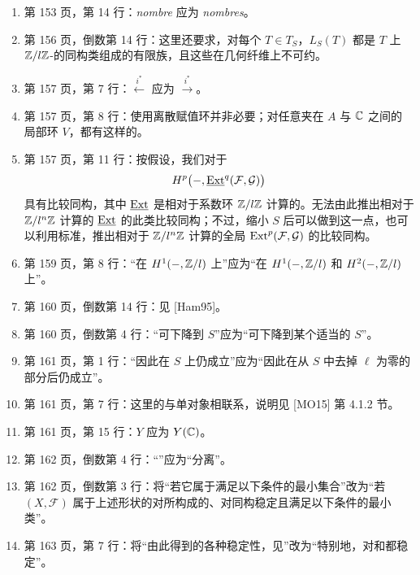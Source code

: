 \begin{enumerate}[label=\arabic*.,leftmargin=2.5em,itemsep=.65\baselineskip]
\[
i^*j_*F=\varprojlim i^*j_*(F/\ell^nF),
\]
其中 $U$ 是若干的开并，$Z$ 为其补集，$F$ 为 $U(\C)$ 上的 $\Z_\ell$-。对满足良好条件的空间，例如来自局部有限三角剖分的空间，这样做是可行的。
\item 第 153 页，第 14 行：\emph{nombre} 应为 \emph{nombres}。
\item 第 156 页，倒数第 14 行：这里还要求，对每个 $T\in T_S$，$L_S(T)$ 都是 $T$ 上 $\mathbb Z/l\mathbb Z$-的同构类组成的有限族，且这些在几何纤维上不可约。
\item 第 157 页，第 7 行：$\xleftarrow{i^*}$ 应为 $\xrightarrow{i^*}$。
\item 第 157 页，第 8 行：使用离散赋值环并非必要；对任意夹在 $A$ 与 $\mathbb C$ 之间的 局部环 $V$，都有这样的。
\item 第 157 页，第 11 行：按假设，我们对于
\[
H^p\bigl(-,\underline{\operatorname{Ext}}^{q}(\mathcal F,\mathcal G)\bigr)
\]
具有比较同构，其中 $\underline{\operatorname{Ext}}$ 是相对于系数环 $\mathbb Z/l\mathbb Z$ 计算的。无法由此推出相对于 $\mathbb Z/l^n\mathbb Z$ 计算的 $\underline{\operatorname{Ext}}$ 的此类比较同构；不过，缩小 $S$ 后可以做到这一点，也可以利用标准，推出相对于 $\mathbb Z/l^n\mathbb Z$ 计算的全局 $\operatorname{Ext}^p(\mathcal F,\mathcal G)$ 的比较同构。
\item 第 159 页，第 8 行：“在 $H^1(-,\mathbb Z/l)$ 上”应为“在 $H^1(-,\mathbb Z/l)$ 和 $H^2(-,\mathbb Z/l)$ 上”。
\item 第 160 页，倒数第 14 行：见 [Ham95]。
\item 第 160 页，倒数第 4 行：“可下降到 $S$”应为“可下降到某个适当的 $S$”。
\item 第 161 页，第 1 行：“因此在 $S$ 上仍成立”应为“因此在从 $S$ 中去掉 $\ell$ 为零的部分后仍成立”。
\item 第 161 页，第 7 行：这里的与单对象相联系，说明见 [MO15] 第 4.1.2 节。
\item 第 161 页，第 15 行：$Y$ 应为 $Y(\mathbb C)$。
\item 第 162 页，倒数第 4 行：“”应为“分离”。
\item 第 162 页，倒数第 3 行：将“若它属于满足以下条件的最小集合”改为“若 $(X,\mathcal F)$ 属于上述形状的对所构成的、对同构稳定且满足以下条件的最小类”。
\item 第 163 页，第 7 行：将“由此得到的各种稳定性，见”改为“特别地，对和都稳定”。

\end{enumerate}
